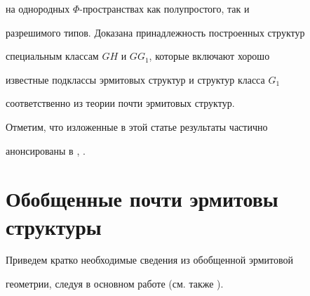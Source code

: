на однородных $\Phi$-прост\-ран\-ст\-вах как полупростого, так и


разрешимого типов. Доказана принадлежность построенных структур


специальным классам $GH$ и $GG_1$, которые включают хорошо


известные подклассы эрмитовых структур и структур класса $G_1$


соответственно из теории почти эрмитовых структур.





Отметим, что изложенные в этой статье результаты частично


анонсированы в \cite{20}, \cite{21}.











\section{Обобщенные почти эрмитовы структуры}





Приведем кратко необходимые сведения из обобщенной эрмитовой


геометрии, следуя в основном работе \cite{4} (см. также \cite{3}).





